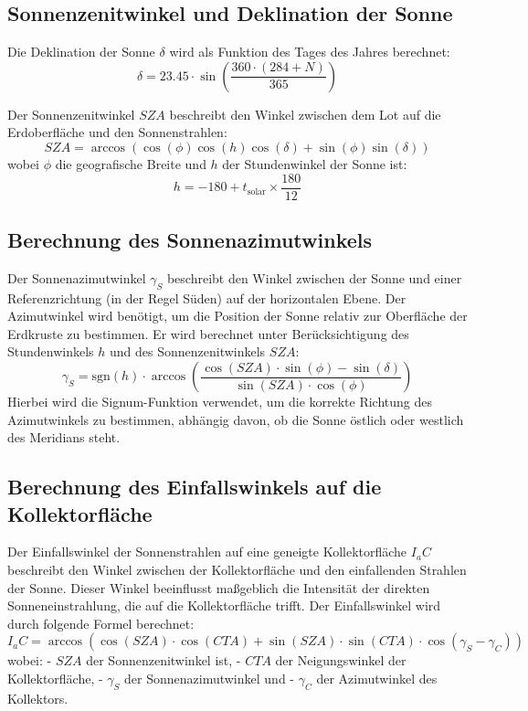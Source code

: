 \subsection{Sonnenzenitwinkel und Deklination der Sonne}

Die Deklination der Sonne \( \delta \) wird als Funktion des Tages des Jahres berechnet:
\[
\delta = 23.45 \cdot \sin\left( \frac{360 \cdot (284 + N)}{365} \right)
\]

Der Sonnenzenitwinkel \( SZA \) beschreibt den Winkel zwischen dem Lot auf die Erdoberfläche und den Sonnenstrahlen:
\[
SZA = \arccos\left( \cos(\phi) \cos(h) \cos(\delta) + \sin(\phi) \sin(\delta) \right)
\]
wobei \( \phi \) die geografische Breite und \( h \) der Stundenwinkel der Sonne ist:
\[
h = -180 + t_{\text{solar}} \times \frac{180}{12}
\]

\subsection{Berechnung des Sonnenazimutwinkels}

Der Sonnenazimutwinkel \( \gamma_S \) beschreibt den Winkel zwischen der Sonne und einer Referenzrichtung (in der Regel Süden) auf der horizontalen Ebene. Der Azimutwinkel wird benötigt, um die Position der Sonne relativ zur Oberfläche der Erdkruste zu bestimmen. Er wird berechnet unter Berücksichtigung des Stundenwinkels \( h \) und des Sonnenzenitwinkels \( SZA \):
\[
\gamma_S = \text{sgn}(h) \cdot \arccos\left(\frac{\cos(SZA) \cdot \sin(\phi) - \sin(\delta)}{\sin(SZA) \cdot \cos(\phi)}\right)
\]
Hierbei wird die Signum-Funktion verwendet, um die korrekte Richtung des Azimutwinkels zu bestimmen, abhängig davon, ob die Sonne östlich oder westlich des Meridians steht.

\subsection{Berechnung des Einfallswinkels auf die Kollektorfläche}

Der Einfallswinkel der Sonnenstrahlen auf eine geneigte Kollektorfläche \( I_aC \) beschreibt den Winkel zwischen der Kollektorfläche und den einfallenden Strahlen der Sonne. Dieser Winkel beeinflusst maßgeblich die Intensität der direkten Sonneneinstrahlung, die auf die Kollektorfläche trifft. Der Einfallswinkel wird durch folgende Formel berechnet:
\[
I_aC = \arccos\left(\cos(SZA) \cdot \cos(CTA) + \sin(SZA) \cdot \sin(CTA) \cdot \cos(\gamma_S - \gamma_C)\right)
\]
wobei:
- \( SZA \) der Sonnenzenitwinkel ist,
- \( CTA \) der Neigungswinkel der Kollektorfläche,
- \( \gamma_S \) der Sonnenazimutwinkel und
- \( \gamma_C \) der Azimutwinkel des Kollektors.

